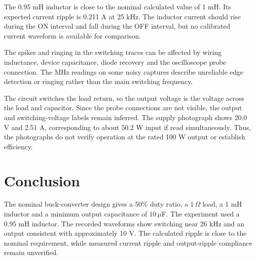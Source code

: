 \documentclass[11pt,a4paper]{article}
\begin{document}
The 0.95 mH inductor is close to the nominal calculated value of 1 mH. Its expected current ripple is 0.211 A at 25 kHz. The inductor current should rise during the ON interval and fall during the OFF interval, but no calibrated current waveform is available for comparison.

The spikes and ringing in the switching traces can be affected by wiring inductance, device capacitance, diode recovery and the oscilloscope probe connection. The MHz readings on some noisy captures describe unreliable edge detection or ringing rather than the main switching frequency.

The circuit switches the load return, so the output voltage is the voltage across the load and capacitor. Since the probe connections are not visible, the output and switching-voltage labels remain inferred. The supply photograph shows 20.0 V and 2.51 A, corresponding to about 50.2 W input if read simultaneously. Thus, the photographs do not verify operation at the rated 100 W output or establish efficiency.

\section{Conclusion}
The nominal buck-converter design gives a 50\% duty ratio, a $1\,\Omega$ load, a 1 mH inductor and a minimum output capacitance of $10\,\mu$F. The experiment used a 0.95 mH inductor. The recorded waveforms show switching near 26 kHz and an output consistent with approximately 10 V. The calculated ripple is close to the nominal requirement, while measured current ripple and output-ripple compliance remain unverified.
\end{document}
